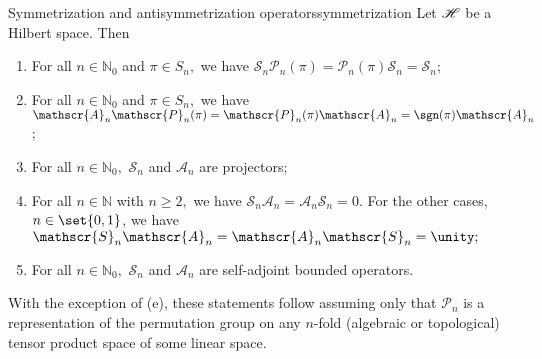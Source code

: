 \begin{proposition}{Symmetrization and antisymmetrization operators}{symmetrization}
    Let \(\mathscr{H}\) be a Hilbert space. Then
    \begin{enumerate}[label=(\alph*)]
        \item For all \(n \in \mathbb{N}_0\) and \(\pi \in S_n,\) we have \(\mathscr{S}_n\mathscr{P}_n(\pi) = \mathscr{P}_n(\pi)\mathscr{S}_n = \mathscr{S}_n\);
        \item For all \(n \in \mathbb{N}_0\) and \(\pi \in S_n,\) we have \(\mathscr{A}_n\mathscr{P}_n(\pi) = \mathscr{P}_n(\pi)\mathscr{A}_n = \sgn(\pi)\mathscr{A}_n\);
        \item For all \(n \in \mathbb{N}_0,\) \(\mathscr{S}_n\) and \(\mathscr{A}_n\) are projectors;
        \item For all \(n \in \mathbb{N}\) with \(n \geq 2,\) we have \(\mathscr{S}_n \mathscr{A}_n = \mathscr{A}_n\mathscr{S}_n = 0.\) For the other cases, \(n \in \set{0,1}\), we have \(\mathscr{S}_n \mathscr{A}_n = \mathscr{A}_n\mathscr{S}_n = \unity;\)
        \item For all \(n \in \mathbb{N}_0,\) \(\mathscr{S}_n\) and \(\mathscr{A}_n\) are self-adjoint bounded operators.
    \end{enumerate}
\end{proposition}
\begin{remark}
    With the exception of (e), these statements follow assuming only that \(\mathscr{P}_n\) is a representation of the permutation group on any \(n\)-fold (algebraic or topological) tensor product space of some linear space.
\end{remark}
